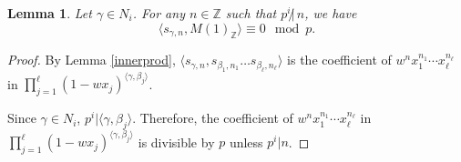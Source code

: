 \documentclass[10pt,a4paper]{amsart}
\newtheorem{lem}{Lemma}
\def\ZZ{{\mathbb Z}}
\begin{document}
\begin{lem}\label{sRi}
Let $\gamma \in N_i$. For any $n\in \ZZ$ such that $p^i\not|\,n$, we have 
\[
\langle s_{\gamma,n}, M(1)_\ZZ\rangle \equiv 0  \mod p. 
\]
\end{lem}

\begin{proof}
By Lemma \ref{innerprod},  
$\langle s_{\gamma,n}, s_{\beta_1,n_1} \dots s_{\beta_\ell,n_\ell} \rangle $
is the coefficient of $w^{n} x_1^{n_1} \cdots x_\ell^{n_{\ell}} $ in $\prod_{j=1}^\ell (1-wx_j)^{\langle \gamma, \beta_j \rangle}$. 

Since  $\gamma \in N_i$, $p^i| {\langle \gamma, \beta_j \rangle}$.  
Therefore, the coefficient of  $w^{n} x_1^{n_1} \cdots x_\ell^{n_{\ell}} $ in $\prod_{j=1}^\ell (1-wx_j)^{\langle \gamma, \beta_j \rangle}$ is divisible by $p$  unless
$p^i | n$. 
\end{proof}
\end{document}
